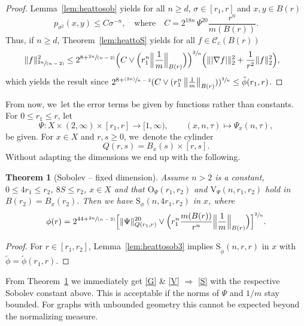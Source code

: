 \documentclass[10pt]{amsart}
\newcommand{\psfrac}[2]{\sfrac{(#1)}{#2}}
\newcommand{\spfrac}[2]{\sfrac{#1}{(#2)}}
\newcommand{\rS}{\mathrm{S}}
\newcommand{\rV}{\mathrm{V}}
\newcommand{\rO}{\mathrm{O}}
\theoremstyle{plain}
\newtheorem{theorem}{Theorem}[section]
\theoremstyle{definition}
\newcommand{\cC}{\mathcal{C}}
\begin{document}
\begin{proof}
Lemma~\ref{lem:heattosob} yields for all $n\geq d$, $\sigma\in[r_1,r]$ and $x,y\in B(r)$
\[
p_{\sigma^2}(x,y)
\leq
C
\sigma^{-{n}}, \quad \text{where}\quad C=2^{18n}\,\Psi^{20}\frac{r^{n}}{m(B(r))}.
\]
Thus, if $n\geq d$,
Theorem~\ref{lem:heattoS} yields
for all $f\in\cC_{c}( B(r))$
\begin{align*}
\Vert f\Vert_{\spfrac{2{n}}{{n}-2}}^2
&
\leq 2^{8+\spfrac{2n}{n-2}}\Bigl(C\vee \Bigl(r_1^{n} \Bigl\Vert\frac1m\Bigr\Vert_{B(r)}\Bigr)\Bigr)^{{\sfrac{2}{n}}}\Bigl(
\Vert \vert\nabla f\vert\Vert_2^2+\frac{1}{r^2}\Vert f\Vert_2^2\Bigr),
\end{align*}
which yields the result since $2^{8+\psfrac{2n}{n-2}}(C\vee (r_1^{n} \left\Vert\tfrac1m\right\Vert_{B(r)}))^{{\sfrac{2}{n}}}\leq \tilde\phi(r_{1},{r}) $.
\end{proof}

From now, we~let the error terms be given by functions rather than constants. For $0\leq r_1\leq r$, let
\[
\Psi\colon X\times(2,\infty)\times[r_1,r]\to[1,\infty),\qquad (x,n,\tau)\longmapsto \Psi_{x}(n,\tau),
\]
be given. For $ x\in X $ and $ r,s\ge0 $, we~denote the cylinder
\[
Q(r,s)=B_{x}(s)\times [r,s].
\]
Without adapting the dimensions we end up with the following.

\begin{theorem}[Sobolev -- fixed dimension]\label{thm:heattosobolevgeneral}Assume $ n\!>\!2 $ is a constant,
\hbox{$0\!\leq\! {4} r_1\!\leq\! r_2$}, $8S\leq r_2$, $x\in X$ and that $ \rO_\Psi(r_1,r_2)$ and $\rV_\Psi (n,r_1,r_2)$ hold in $B(r_2)=B_{x}(r_{2})$.
Then we have $\rS_\phi(n, {4}r_1,r_2)$ in $x$, where
\[
\phi(r)=2^{44+\spfrac{2n}{n-2}}\Bigl[{\Vert \Psi\Vert_{Q(r_1,r)}^{20}}\vee \Bigl( r_1^{n}\frac{m(B(r))}{r^{n}}\Bigl\Vert\frac1m\Bigr\Vert_{B(r)}\Bigr) \Bigr]^{\sfrac{2}{n}}.
\]
\end{theorem}

\begin{proof}
For $r\in[r_1,r_2]$, Lemma~\ref{lem:heattosob3} implies $\rS_{\tilde \phi}(n,r,r)$ in $x$ with $ \tilde\phi =\tilde{\phi}(r_{1},r)$.
\end{proof}

From Theorem~\ref{thm:heattosobolevgeneral} we immediately get \eqref{G} \& \eqref{V} $ \Rightarrow $ \eqref{S} with the respective Sobolev constant above. This is acceptable if the norms of $ \Psi $ and $ 1/m $ stay bounded. For graphs with unbounded geometry this cannot be expected beyond the normalizing measure.
\end{document}
